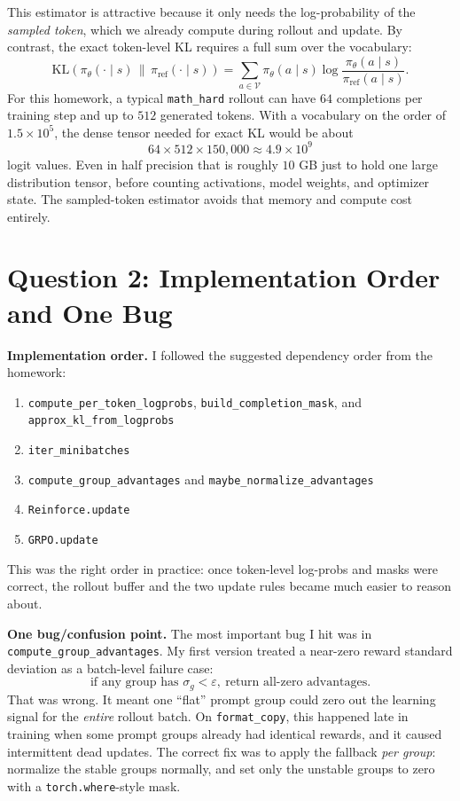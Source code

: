 \documentclass[11pt]{article}
\begin{document}
This estimator is attractive because it only needs the log-probability of the \emph{sampled token}, which we already compute during rollout and update. By contrast, the exact token-level KL requires a full sum over the vocabulary:
\[
\mathrm{KL}\!\left(\pi_\theta(\cdot \mid s)\,\|\,\pi_{\mathrm{ref}}(\cdot \mid s)\right)
= \sum_{a \in \mathcal V}
\pi_\theta(a \mid s)
\log \frac{\pi_\theta(a \mid s)}{\pi_{\mathrm{ref}}(a \mid s)}.
\]
For this homework, a typical \texttt{math\_hard} rollout can have \(64\) completions per training step and up to \(512\) generated tokens. With a vocabulary on the order of \(1.5 \times 10^5\), the dense tensor needed for exact KL would be about
\[
64 \times 512 \times 150{,}000 \approx 4.9 \times 10^9
\]
logit values. Even in half precision that is roughly \(10\) GB just to hold one large distribution tensor, before counting activations, model weights, and optimizer state. The sampled-token estimator avoids that memory and compute cost entirely.

\section{Question 2: Implementation Order and One Bug}
\textbf{Implementation order.} I followed the suggested dependency order from the homework:
\begin{enumerate}[leftmargin=1.6em]
\item \texttt{compute\_per\_token\_logprobs}, \texttt{build\_completion\_mask}, and \texttt{approx\_kl\_from\_logprobs}
\item \texttt{iter\_minibatches}
\item \texttt{compute\_group\_advantages} and \texttt{maybe\_normalize\_advantages}
\item \texttt{Reinforce.update}
\item \texttt{GRPO.update}
\end{enumerate}
This was the right order in practice: once token-level log-probs and masks were correct, the rollout buffer and the two update rules became much easier to reason about.

\textbf{One bug/confusion point.} The most important bug I hit was in \texttt{compute\_group\_advantages}. My first version treated a near-zero reward standard deviation as a batch-level failure case:
\[
\text{if any group has } \sigma_g < \varepsilon,\ \text{return all-zero advantages.}
\]
That was wrong. It meant one ``flat'' prompt group could zero out the learning signal for the \emph{entire} rollout batch. On \texttt{format\_copy}, this happened late in training when some prompt groups already had identical rewards, and it caused intermittent dead updates. The correct fix was to apply the fallback \emph{per group}: normalize the stable groups normally, and set only the unstable groups to zero with a \texttt{torch.where}-style mask.
\end{document}
